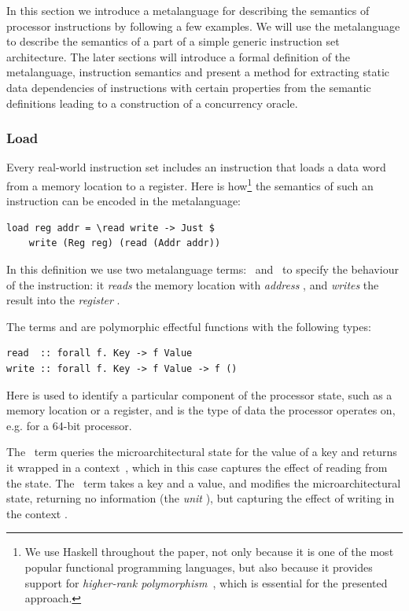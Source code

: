 In this section we introduce a metalanguage for describing the semantics of
processor instructions by following a few examples. We will use the metalanguage
to describe the semantics of a part of a simple generic instruction set
architecture. The later sections will introduce a formal definition of the
metalanguage, instruction semantics and present a method for
extracting static data dependencies of instructions with certain properties from
the semantic definitions leading to a construction of a concurrency oracle.

\subsubsection{Load} Every real-world instruction set includes an instruction
that loads a data word from a memory location to a register. Here is
how\footnote{We use Haskell throughout the paper, not only because it is one of
the most popular functional programming languages, but also because it provides
support for \emph{higher-rank polymorphism}~\cite{jones2007practical}, which is
essential for the presented approach.} the semantics of such an instruction can
be encoded in the metalanguage:

\begin{verbatim}
load reg addr = \read write -> Just $
    write (Reg reg) (read (Addr addr))
\end{verbatim}

\noindent
In this definition we use two metalanguage terms:~ and~ to
specify the behaviour of the instruction: it \emph{reads} the memory location
with \emph{address} , and \emph{writes} the result into the
\emph{register} .

The terms  and  are polymorphic effectful functions with the
following types:

\begin{verbatim}
read  :: forall f. Key -> f Value
write :: forall f. Key -> f Value -> f ()
\end{verbatim}

\noindent
Here  is used to identify a particular component of the processor state,
such as a memory location or a register, and  is the type of data the
processor operates on, e.g.  for a 64-bit processor.

The~ term queries the microarchitectural state for the value of a key
and returns it wrapped in a context~, which in this case captures the
effect of reading from the state. The~ term takes a key and a value,
and modifies the microarchitectural state, returning no information (the
\emph{unit} \hs{()}), but capturing the effect of writing in the context .

